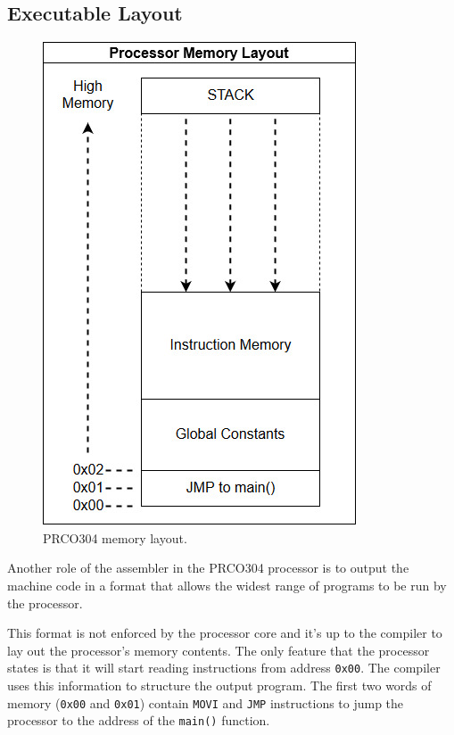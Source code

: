\documentclass[11pt,a4paper]{report}
\newcommand{\scname}{PRCO304}
\begin{document}
\subsection{Executable Layout}

\begin{figure}[H]
\begin{center}
\includegraphics[scale=0.4]{prco_memory_layout}
\end{center}
\caption{\scname{} memory layout.}
\label{fig:asm_mem_layout}
\end{figure}

Another role of the assembler in the \scname{} processor is to output the machine code in a format that allows the widest range of programs to be run by the processor.

This format is not enforced by the processor core and it's up to the compiler to lay out the processor's memory contents. The only feature that the processor states is that it will start reading instructions from address \verb|0x00|. The compiler uses this information to structure the output program. The first two words of memory (\verb|0x00| and \verb|0x01|) contain \verb|MOVI| and \verb|JMP| instructions to jump the processor to the address of the \verb|main()| function.
\end{document}
